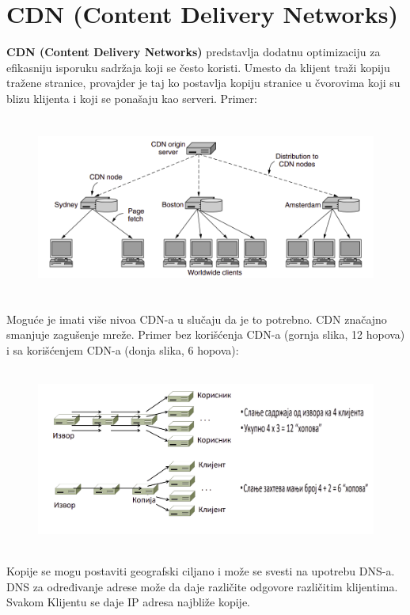 \documentclass[a4paper]{article}
\begin{document}
\section{CDN (Content Delivery Networks)}
    \textbf{CDN (Content Delivery Networks)} predstavlja dodatnu optimizaciju za efikasniju 
    isporuku sadržaja koji se često koristi. Umesto da klijent traži kopiju tražene stranice,
    provajder je taj ko postavlja kopiju stranice u čvorovima koji su blizu klijenta i koji
    se ponašaju kao serveri. Primer:
    \begin{figure}[H]
        \begin{center}
            \includegraphics[width=120mm,height=60mm]{Slike/cdn1.png}
        \end{center}
    \end{figure}
    Moguće je imati više nivoa CDN-a u slučaju da je to potrebno. CDN značajno smanjuje zagušenje
    mreže. Primer bez korišćenja CDN-a (gornja slika, 12 hopova) i sa korišćenjem CDN-a 
    (donja slika, 6 hopova):
    \begin{figure}[H]
        \begin{center}
            \includegraphics[width=120mm,height=60mm]{Slike/cdn2.png}
        \end{center}
    \end{figure}
    Kopije se mogu postaviti geografski ciljano i može se svesti na upotrebu DNS-a.
    DNS za određivanje adrese može da daje različite odgovore različitim klijentima. Svakom
    Klijentu se daje IP adresa najbliže kopije.\\
\end{document}
